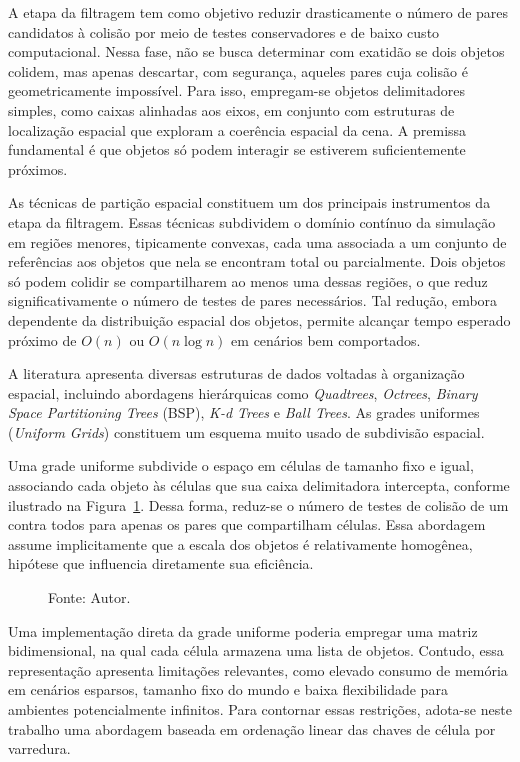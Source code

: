 A etapa da filtragem tem como objetivo reduzir drasticamente o número de pares candidatos à colisão por meio de testes conservadores e de baixo custo computacional. Nessa fase, não se busca determinar com exatidão se dois objetos colidem, mas apenas descartar, com segurança, aqueles pares cuja colisão é geometricamente impossível. Para isso, empregam-se objetos delimitadores simples, como caixas alinhadas aos eixos, em conjunto com estruturas de localização espacial que exploram a coerência espacial da cena. A premissa fundamental é que objetos só podem interagir se estiverem suficientemente próximos.

As técnicas de partição espacial constituem um dos principais instrumentos da etapa da filtragem. Essas técnicas subdividem o domínio contínuo da simulação em regiões menores, tipicamente convexas, cada uma associada a um conjunto de referências aos objetos que nela se encontram total ou parcialmente. Dois objetos só podem colidir se compartilharem ao menos uma dessas regiões, o que reduz significativamente o número de testes de pares necessários. Tal redução, embora dependente da distribuição espacial dos objetos, permite alcançar tempo esperado próximo de $O(n)$ ou $O(n \log n)$ em cenários bem comportados.

A literatura apresenta diversas estruturas de dados voltadas à organização espacial, incluindo abordagens hierárquicas como \textit{Quadtrees}, \textit{Octrees}, \textit{Binary Space Partitioning Trees} (BSP), \textit{K-d Trees} e \textit{Ball Trees}. As grades uniformes (\textit{Uniform Grids}) constituem um esquema muito usado de subdivisão espacial. 

Uma grade uniforme subdivide o espaço em células de tamanho fixo e igual, associando cada objeto às células que sua caixa delimitadora intercepta, conforme ilustrado na Figura~\ref{fig:grade-uniforme}. Dessa forma, reduz-se o número de testes de colisão de um contra todos para apenas os pares que compartilham células. Essa abordagem assume implicitamente que a escala dos objetos é relativamente homogênea, hipótese que influencia diretamente sua eficiência.

\begin{figure}[htb]
	\caption{Divisão espacial em grade uniforme}
	\centering
	
	\caption{Fonte: Autor.}
	\label{fig:grade-uniforme}
\end{figure}

Uma implementação direta da grade uniforme poderia empregar uma matriz bidimensional, na qual cada célula armazena uma lista de objetos. Contudo, essa representação apresenta limitações relevantes, como elevado consumo de memória em cenários esparsos, tamanho fixo do mundo e baixa flexibilidade para ambientes potencialmente infinitos. Para contornar essas restrições, adota-se neste trabalho uma abordagem baseada em ordenação linear das chaves de célula por varredura.

